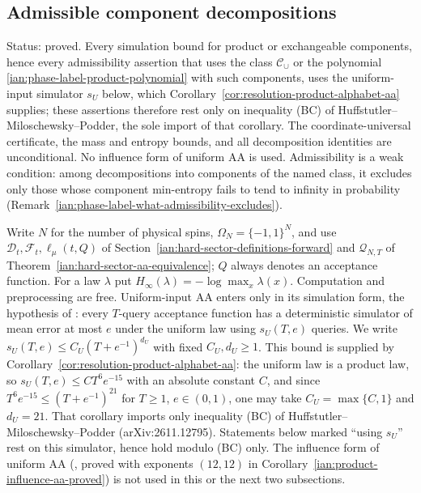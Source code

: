 \subsection{Admissible component decompositions}
\label{ian:phase-label-admissibility}

Status: proved. Every simulation bound for product or exchangeable components, hence every admissibility assertion that uses the class \(\mathcal C_\cup\) or the polynomial \eqref{ian:phase-label-product-polynomial} with such components, uses the uniform-input simulator \(s_U\) below, which Corollary~\ref{cor:resolution-product-alphabet-aa} supplies; these assertions therefore rest only on inequality (BC) of Huffstutler--Miloschewsky--Podder, the sole import of that corollary. The coordinate-universal certificate, the mass and entropy bounds, and all decomposition identities are unconditional. No influence form of uniform AA is used. Admissibility is a weak condition: among decompositions into components of the named class, it excludes only those whose component min-entropy fails to tend to infinity in probability (Remark~\ref{ian:phase-label-what-admissibility-excludes}).

Write \(N\) for the number of physical spins, \(\Omega_N=\{-1,1\}^N\), and
use \(\mathcal D_t,\mathcal F_t,\ell_\mu(t,Q)\) of
Section~\ref{ian:hard-sector-definitions-forward} and \(\mathcal Q_{N,T}\)
of Theorem~\ref{ian:hard-sector-aa-equivalence}; \(Q\) always denotes an
acceptance function. For a law \(\lambda\) put
\(H_\infty(\lambda)=-\log\max_x\lambda(x)\). Computation and
preprocessing are free. Uniform-input AA enters only in its simulation
form, the hypothesis of
: every \(T\)-query
acceptance function has a deterministic simulator of mean error at most
\(e\) under the uniform law using \(s_U(T,e)\) queries. We write
\(s_U(T,e)\le C_U(T+e^{-1})^{d_U}\) with fixed \(C_U,d_U\ge1\). This
bound is supplied by Corollary~\ref{cor:resolution-product-alphabet-aa}:
the uniform law is a product law, so \(s_U(T,e)\le CT^6e^{-15}\) with an
absolute constant \(C\), and since
\(T^6e^{-15}\le(T+e^{-1})^{21}\) for \(T\ge1\), \(e\in(0,1)\), one may
take \(C_U=\max\{C,1\}\) and \(d_U=21\). That corollary imports only
inequality (BC) of Huffstutler--Miloschewsky--Podder
(arXiv:2611.12795). Statements below marked ``using \(s_U\)'' rest on
this simulator, hence hold modulo (BC) only. The influence form of
uniform AA
(,
proved with exponents \((12,12)\) in
Corollary~\ref{ian:product-influence-aa-proved}) is not used in this or
the next two subsections.

